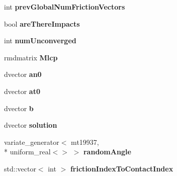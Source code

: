 \begin{DoxyCompactItemize}
\item 
\hypertarget{classOpenHRP_1_1CFSImpl_a2cd7b5ba2229e11fad23c6e410f6777c}{int {\bfseries prev\-Global\-Num\-Friction\-Vectors}}\label{classOpenHRP_1_1CFSImpl_a2cd7b5ba2229e11fad23c6e410f6777c}

\item 
\hypertarget{classOpenHRP_1_1CFSImpl_a75a17c81017a228d10a54cf35a5018d0}{bool {\bfseries are\-There\-Impacts}}\label{classOpenHRP_1_1CFSImpl_a75a17c81017a228d10a54cf35a5018d0}

\item 
\hypertarget{classOpenHRP_1_1CFSImpl_a67ee2aadab7c4f8c69b71e0edfd841ea}{int {\bfseries num\-Unconverged}}\label{classOpenHRP_1_1CFSImpl_a67ee2aadab7c4f8c69b71e0edfd841ea}

\item 
\hypertarget{classOpenHRP_1_1CFSImpl_afcc6138e7f51f1fcdc87d23e83d821b8}{rmdmatrix {\bfseries Mlcp}}\label{classOpenHRP_1_1CFSImpl_afcc6138e7f51f1fcdc87d23e83d821b8}

\item 
\hypertarget{classOpenHRP_1_1CFSImpl_a31d3eaf4bbebe10c0af25d96b1d28f61}{dvector {\bfseries an0}}\label{classOpenHRP_1_1CFSImpl_a31d3eaf4bbebe10c0af25d96b1d28f61}

\item 
\hypertarget{classOpenHRP_1_1CFSImpl_a4c98cce0993a0e2c3c46c629c966b741}{dvector {\bfseries at0}}\label{classOpenHRP_1_1CFSImpl_a4c98cce0993a0e2c3c46c629c966b741}

\item 
\hypertarget{classOpenHRP_1_1CFSImpl_a4d086631c2c270951dbf930ae1c920db}{dvector {\bfseries b}}\label{classOpenHRP_1_1CFSImpl_a4d086631c2c270951dbf930ae1c920db}

\item 
\hypertarget{classOpenHRP_1_1CFSImpl_a0043031b5bec32ed4d56803fb2ff2376}{dvector {\bfseries solution}}\label{classOpenHRP_1_1CFSImpl_a0043031b5bec32ed4d56803fb2ff2376}

\item 
\hypertarget{classOpenHRP_1_1CFSImpl_ac1845e9659c50ad4580ffcd25b9c6a03}{variate\-\_\-generator$<$ mt19937, \\*
uniform\-\_\-real$<$$>$ $>$ {\bfseries random\-Angle}}\label{classOpenHRP_1_1CFSImpl_ac1845e9659c50ad4580ffcd25b9c6a03}

\item 
\hypertarget{classOpenHRP_1_1CFSImpl_afd4c77d9f419545118d398b7ef874275}{std\-::vector$<$ int $>$ {\bfseries friction\-Index\-To\-Contact\-Index}}\label{classOpenHRP_1_1CFSImpl_afd4c77d9f419545118d398b7ef874275}


\end{DoxyCompactItemize}
